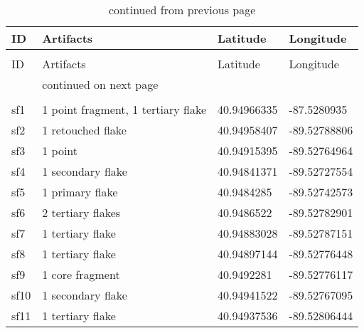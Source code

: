 \pagebreak
\begin{longtable}{p{1cm}p{6cm}ll}
	\caption{Results of pedestrian survey}\\
	\label{table_1}
	ID & Artifacts & Latitude & Longitude \\
	\hline
	\endfirsthead %
	\caption{continued from previous page}\\
	ID & Artifacts & Latitude & Longitude \\
	\hline
	\endhead %
	\hline
	& continued on next page\\
	\endfoot
	\hline
	\\
	\endlastfoot
	sf1 & 1 point fragment, 1 tertiary flake & 40.94966335 & -87.5280935\\
	sf2 & 1 retouched flake & 40.94958407 & -89.52788806\\
	sf3 & 1 point & 40.94915395 & -89.52764964\\
	sf4 & 1 secondary flake & 40.94841371 & -89.52727554\\
	sf5 & 1 primary flake & 40.9484285 & -89.52742573\\
	sf6 & 2 tertiary flakes & 40.9486522 & -89.52782901\\
	sf7 & 1 tertiary flake & 40.94883028 & -89.52787151\\
	sf8 & 1 tertiary flake & 40.94897144 & -89.52776448\\
	sf9 & 1 core fragment & 40.9492281 & -89.52776117\\
	sf10 & 1 secondary flake & 40.94941522& -89.52767095\\
	sf11 & 1 tertiary flake & 40.94937536 & -89.52806444\\


\end{longtable}
